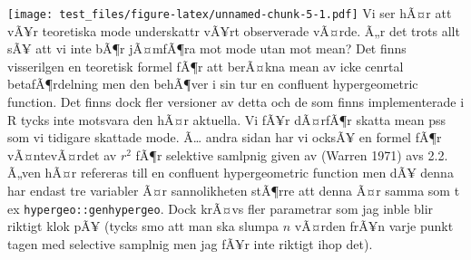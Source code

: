 \documentclass[]{article}
\newenvironment{Shaded}{\begin{snugshade}}{\end{snugshade}}
\newcommand{\KeywordTok}[1]{\textcolor[rgb]{0.13,0.29,0.53}{\textbf{{#1}}}}
\newcommand{\DataTypeTok}[1]{\textcolor[rgb]{0.13,0.29,0.53}{{#1}}}
\newcommand{\DecValTok}[1]{\textcolor[rgb]{0.00,0.00,0.81}{{#1}}}
\newcommand{\FloatTok}[1]{\textcolor[rgb]{0.00,0.00,0.81}{{#1}}}
\newcommand{\StringTok}[1]{\textcolor[rgb]{0.31,0.60,0.02}{{#1}}}
\newcommand{\CommentTok}[1]{\textcolor[rgb]{0.56,0.35,0.01}{\textit{{#1}}}}
\newcommand{\NormalTok}[1]{{#1}}
\begin{document}
\begin{Shaded}
\end{Shaded}

\texttt{[image: test\_files/figure-latex/unnamed-chunk-5-1.pdf]} Vi ser
hÃ¤r att vÃ¥r teoretiska mode underskattr vÃ¥rt observerade vÃ¤rde. Ã„r
det trots allt sÃ¥ att vi inte bÃ¶r jÃ¤mfÃ¶ra mot mode utan mot mean?
Det finns visserilgen en teoretisk formel fÃ¶r att berÃ¤kna mean av icke
cenrtal betafÃ¶rdelning men den behÃ¶ver i sin tur en confluent
hypergeometric function. Det finns dock fler versioner av detta och de
som finns implementerade i R tycks inte motsvara den hÃ¤r aktuella. Vi
fÃ¥r dÃ¤rfÃ¶r skatta mean pss som vi tidigare skattade mode. Ã\ldots{}
andra sidan har vi ocksÃ¥ en formel fÃ¶r vÃ¤ntevÃ¤rdet av \(r^2\) fÃ¶r
selektive samlpnig given av (Warren 1971) avs 2.2. Ã„ven hÃ¤r refereras
till en confluent hypergeometric function men dÃ¥ denna har endast tre
variabler Ã¤r sannolikheten stÃ¶rre att denna Ã¤r samma som t ex
\texttt{hypergeo::genhypergeo}. Dock krÃ¤vs fler parametrar som jag
inble blir riktigt klok pÃ¥ (tycks smo att man ska slumpa \(n\) vÃ¤rden
frÃ¥n varje punkt tagen med selective samplnig men jag fÃ¥r inte riktigt
ihop det).
\end{document}
